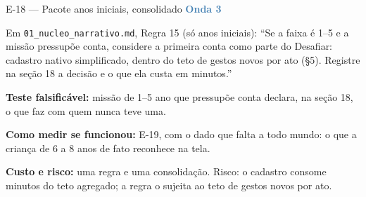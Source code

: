 \documentclass[11pt,a4paper]{article}
\newcommand{\onda}[1]{\textcolor{SteelBlue}{\textbf{Onda #1}}}
\begin{document}
\begin{emendabox}{E-18 --- Pacote anos iniciais, consolidado \hfill \onda{3}}
\begin{depoisbox}\small
Em \texttt{01\_nucleo\_narrativo.md}, Regra 15 (só anos iniciais): ``Se a faixa é
1\textordmasculine{}--5\textordmasculine{} e a missão pressupõe conta, considere a primeira conta
como parte do Desafiar: cadastro nativo simplificado, dentro do teto de gestos novos por ato
(\S5). Registre na seção 18 a decisão e o que ela custa em minutos.''
\end{depoisbox}

\textbf{Teste falsificável:} missão de 1\textordmasculine{}--5\textordmasculine{} ano que pressupõe
conta declara, na seção 18, o que faz com quem nunca teve uma.

\textbf{Como medir se funcionou:} E-19, com o dado que falta a todo mundo: o que a criança de 6 a 8
anos de fato reconhece na tela.

\textbf{Custo e risco:} uma regra e uma consolidação. Risco: o cadastro consome minutos do teto
agregado; a regra o sujeita ao teto de gestos novos por ato.
\end{emendabox}
\end{document}
